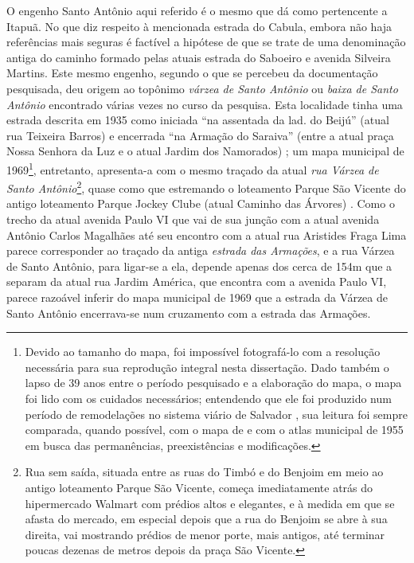 O engenho Santo Antônio aqui referido é o mesmo que  dá como pertencente a Itapuã. No que diz respeito à mencionada estrada do Cabula, embora não haja referências mais seguras é factível a hipótese de que se trate de uma denominação antiga do caminho formado pelas atuais estrada do Saboeiro e avenida Silveira Martins. Este mesmo engenho, segundo o que se percebeu da documentação pesquisada, deu origem ao topônimo \textit{várzea de Santo Antônio} ou \textit{baixa de Santo Antônio} encontrado várias vezes no curso da pesquisa. Esta localidade tinha uma estrada descrita em 1935 como iniciada ``na assentada da lad. do Beijú'' (atual rua Teixeira Barros) e encerrada ``na Armação do Saraiva'' (entre a atual praça Nossa Senhora da Luz e o atual Jardim dos Namorados) \cite[p.~142]{souza_guia_1935}; um mapa municipal de 1969\footnote{Devido ao tamanho do mapa, foi impossível fotografá-lo com a resolução necessária para sua reprodução integral nesta dissertação. Dado também o lapso de 39 anos entre o período pesquisado e a elaboração do mapa, o mapa foi lido com os cuidados necessários; entendendo que ele foi produzido num período de remodelações no sistema viário de Salvador \cite[pp.~24-39]{SCHEINOWITZ1997}, sua leitura foi sempre comparada, quando possível, com o mapa de  e com o atlas municipal de 1955 \cite{municipal_atlas_1955} em busca das permanências, preexistências e modificações.}, entretanto, apresenta-a com o mesmo traçado da atual \textit{rua Várzea de Santo Antônio}\footnote{Rua sem saída, situada entre as ruas do Timbó e do Benjoim em meio ao antigo loteamento Parque São Vicente, começa imediatamente atrás do hipermercado Walmart com prédios altos e elegantes, e à medida em que se afasta do mercado, em especial depois que a rua do Benjoim se abre à sua direita, vai mostrando prédios de menor porte, mais antigos, até terminar poucas dezenas de metros depois da praça São Vicente.}, quase como que estremando o loteamento Parque São Vicente do antigo loteamento Parque Jockey Clube (atual Caminho das Árvores) \cite{salvador_mapa_1969}. Como o trecho da atual avenida Paulo VI que vai de sua junção com a atual avenida Antônio Carlos Magalhães até seu encontro com a atual rua Aristides Fraga Lima parece corresponder ao traçado da antiga \textit{estrada das Armações}, e a rua Várzea de Santo Antônio, para ligar-se a ela, depende apenas dos cerca de 154m que a separam da atual rua Jardim América, que encontra com a avenida Paulo VI, parece razoável inferir do mapa municipal de 1969 que a estrada da Várzea de Santo Antônio encerrava-se num cruzamento com a estrada das Armações.  

